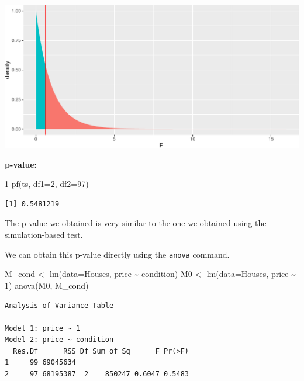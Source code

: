 \documentclass[
  letterpaper,
  DIV=11,
  numbers=noendperiod]{scrreprt}
\newenvironment{Shaded}{\begin{snugshade}}{\end{snugshade}}
\newcommand{\AttributeTok}[1]{\textcolor[rgb]{0.40,0.45,0.13}{#1}}
\newcommand{\DecValTok}[1]{\textcolor[rgb]{0.68,0.00,0.00}{#1}}
\newcommand{\FunctionTok}[1]{\textcolor[rgb]{0.28,0.35,0.67}{#1}}
\newcommand{\NormalTok}[1]{\textcolor[rgb]{0.00,0.23,0.31}{#1}}
\newcommand{\OtherTok}[1]{\textcolor[rgb]{0.00,0.23,0.31}{#1}}
\newcommand{\SpecialCharTok}[1]{\textcolor[rgb]{0.37,0.37,0.37}{#1}}
\begin{document}
\includegraphics{Ch4_files/figure-pdf/unnamed-chunk-49-1.pdf}

\textbf{p-value:}

\begin{Shaded}
\begin{Highlighting}[]
\DecValTok{1}\SpecialCharTok{{-}}\FunctionTok{pf}\NormalTok{(ts, }\AttributeTok{df1=}\DecValTok{2}\NormalTok{, }\AttributeTok{df2=}\DecValTok{97}\NormalTok{)}
\end{Highlighting}
\end{Shaded}

\begin{verbatim}
[1] 0.5481219
\end{verbatim}

The p-value we obtained is very similar to the one we obtained using the
simulation-based test.

We can obtain this p-value directly using the \texttt{anova} command.

\begin{Shaded}
\begin{Highlighting}[]
\NormalTok{M\_cond }\OtherTok{\textless{}{-}} \FunctionTok{lm}\NormalTok{(}\AttributeTok{data=}\NormalTok{Houses, price }\SpecialCharTok{\textasciitilde{}}\NormalTok{ condition)}
\NormalTok{M0 }\OtherTok{\textless{}{-}} \FunctionTok{lm}\NormalTok{(}\AttributeTok{data=}\NormalTok{Houses, price }\SpecialCharTok{\textasciitilde{}} \DecValTok{1}\NormalTok{)}
\FunctionTok{anova}\NormalTok{(M0, M\_cond)}
\end{Highlighting}
\end{Shaded}

\begin{verbatim}
Analysis of Variance Table

Model 1: price ~ 1
Model 2: price ~ condition
  Res.Df      RSS Df Sum of Sq      F Pr(>F)
1     99 69045634                           
2     97 68195387  2    850247 0.6047 0.5483
\end{verbatim}
\end{document}
